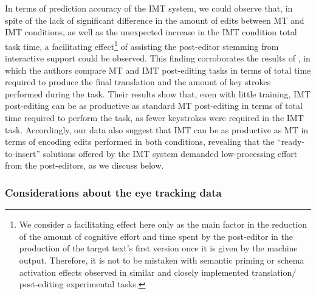\documentclass[output=paper]{langsci/langscibook}
\begin{document}
In terms of prediction accuracy of the IMT system, we could observe that, in spite of the lack of significant difference in the amount of edits between MT and IMT conditions, as well as the unexpected increase in the IMT condition total task time, a facilitating effect\footnote{ We consider a facilitating effect here only as the main factor in the reduction of the amount of cognitive effort and time spent by the post-editor in the production of the target text's first version once it is given by the machine output. Therefore, it is not to be mistaken with semantic priming or schema activation effects observed in similar and closely implemented translation/ post-editing experimental tasks.} of assisting the post-editor stemming from interactive support could be observed. This finding corroborates the results of \citet{sanchis2014interactive}, in which the authors compare MT and IMT post-editing tasks in terms of total time required to produce the final translation and the amount of key strokes performed during the task. Their results show that, even with little training, IMT post-editing can be as productive as standard MT post-editing in terms of total time required to perform the task, as fewer keystrokes were required in the IMT task. Accordingly, our data also suggest that IMT can be as productive as MT in terms of encoding edits performed in both conditions, revealing that the ``ready-to-insert'' solutions offered by the IMT system demanded low-processing effort from the post-editors, as we discuss below.


\subsubsection{Considerations about the eye tracking data\label{alves:sec:ConsiderationsAboutTheEyetracking}}
\end{document}
